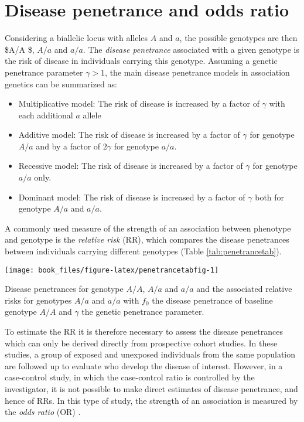 \documentclass[]{book}
\begin{document}
\hypertarget{OR}{%
\section{Disease penetrance and odds ratio}\label{OR}}

Considering a biallelic locus with alleles \(A\) and \(a\), the possible
genotypes are then \$A/A \$, \(A/a\) and \(a/a\). The \emph{disease penetrance}
associated with a given genotype is the risk of disease in individuals
carrying this genotype. Assuming a genetic penetrance parameter
\(\gamma > 1\), the main disease penetrance models in association genetics
can be summarized as:

\begin{itemize}
\item
  Multiplicative model: The risk of disease is increased by a factor
  of \(\gamma\) with each additional \(a\) allele
\item
  Additive model: The risk of disease is increased by a factor of
  \(\gamma\) for genotype \(A/a\) and by a factor of \(2 \gamma\) for
  genotype \(a/a\).
\item
  Recessive model: The risk of disease is increased by a factor of
  \(\gamma\) for genotype \(a/a\) only.
\item
  Dominant model: The risk of disease is increased by a factor of
  \(\gamma\) both for genotype \(A/a\) and \(a/a\).
\end{itemize}

A commonly used measure of the strength of an association between
phenotype and genotype is the \emph{relative risk} (RR), which compares the
disease penetrances between individuals carrying different genotypes
(Table \ref{tab:penetrancetab}).

\begin{center}\texttt{[image: book\_files/figure-latex/penetrancetabfig-1]} \end{center}

\label{tab:penetrancetab}Disease penetrances for genotype \(A/A\), \(A/a\) and \(a/a\) and the associated relative risks for genotypes \(A/a\) and \(a/a\) with \(f_0\) the disease penetrance of baseline genotype \(A/A\) and \(\gamma\) the genetic penetrance parameter.

To estimate the RR it is therefore necessary to assess the disease
penetrances which can only be derived directly from prospective cohort
studies. In these studies, a group of exposed and unexposed individuals
from the same population are followed up to evaluate who develop the
disease of interest. However, in a case-control study, in which the
case-control ratio is controlled by the investigator, it is not possible
to make direct estimates of disease penetrance, and hence of RRs. In
this type of study, the strength of an association is measured by the
\emph{odds ratio} (OR) \citep{clarke2011basic}.
\end{document}
